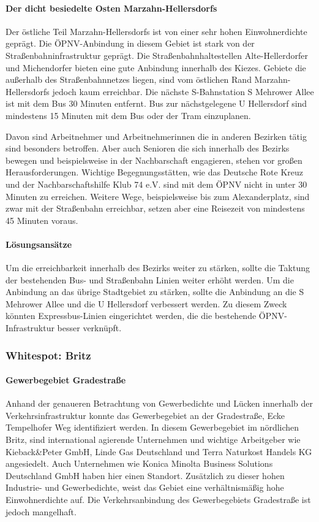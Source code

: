 \paragraph{Der dicht besiedelte Osten Marzahn-Hellersdorfs}
Der östliche Teil Marzahn-Hellersdorfs ist von einer sehr hohen Einwohnerdichte geprägt. Die ÖPNV-Anbindung in diesem Gebiet ist stark von der Straßenbahninfrastruktur geprägt. Die Straßenbahnhaltestellen Alte-Hellerdorfer und Michendorfer bieten eine gute Anbindung innerhalb des Kiezes. Gebiete die außerhalb des Straßenbahnnetzes liegen, sind vom östlichen Rand Marzahn-Hellersdorfs jedoch kaum erreichbar. Die nächste S-Bahnstation S Mehrower Allee ist mit dem Bus 30 Minuten entfernt. Bus zur nächstgelegene U Hellersdorf sind mindestens 15 Minuten mit dem Bus oder der Tram einzuplanen.

Davon sind Arbeitnehmer und Arbeitnehmerinnen die in anderen Bezirken tätig sind besonders betroffen. Aber auch Senioren die sich innerhalb des Bezirks bewegen und beispielsweise in der Nachbarschaft engagieren, stehen vor großen Herausforderungen. Wichtige Begegnungsstätten, wie das Deutsche Rote Kreuz und der Nachbarschaftshilfe Klub 74 e.V. sind mit dem ÖPNV nicht in unter 30 Minuten zu erreichen. Weitere Wege, beispielsweise bis zum Alexanderplatz, sind zwar mit der Straßenbahn erreichbar, setzen aber eine Reisezeit von mindestens 45 Minuten voraus.

\paragraph{Lösungsansätze}
Um die erreichbarkeit innerhalb des Bezirks weiter zu stärken, sollte die Taktung der bestehenden Bus- und Straßenbahn Linien weiter erhöht werden. Um die Anbindung an das übrige Stadtgebiet zu stärken, sollte die Anbindung an die S Mehrower Allee und die U Hellersdorf verbessert werden. Zu diesem Zweck könnten Expressbus-Linien eingerichtet werden, die die bestehende ÖPNV-Infrastruktur besser verknüpft.








\subsubsection{Whitespot: Britz}
\paragraph{Gewerbegebiet Gradestraße}
Anhand der genaueren Betrachtung von Gewerbedichte und Lücken innerhalb der Verkehrsinfrastruktur konnte das Gewerbegebiet an der Gradestraße, Ecke Tempelhofer Weg identifiziert werden. In diesem Gewerbegebiet im nördlichen Britz, sind international agierende Unternehmen und wichtige Arbeitgeber wie Kieback\&Peter GmbH, Linde Gas Deutschland und Terra Naturkost Handels KG angesiedelt. Auch Unternehmen wie Konica Minolta Business Solutions Deutschland GmbH haben hier einen Standort. Zusätzlich zu dieser hohen Industrie- und Gewerbedichte, weist das Gebiet eine verhältnismäßig hohe Einwohnerdichte auf. Die Verkehrsanbindung des Gewerbegebiets Gradestraße ist jedoch mangelhaft.

